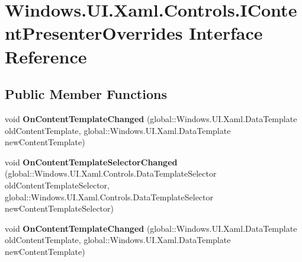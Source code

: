\hypertarget{interface_windows_1_1_u_i_1_1_xaml_1_1_controls_1_1_i_content_presenter_overrides}{}\section{Windows.\+U\+I.\+Xaml.\+Controls.\+I\+Content\+Presenter\+Overrides Interface Reference}
\label{interface_windows_1_1_u_i_1_1_xaml_1_1_controls_1_1_i_content_presenter_overrides}
\subsection*{Public Member Functions}
\begin{DoxyCompactItemize}
\item 
\mbox{\label{interface_windows_1_1_u_i_1_1_xaml_1_1_controls_1_1_i_content_presenter_overrides_ae8281d9b7f3dd003dfccb2720b1405d3}} 
void {\bfseries On\+Content\+Template\+Changed} (global\+::\+Windows.\+U\+I.\+Xaml.\+Data\+Template old\+Content\+Template, global\+::\+Windows.\+U\+I.\+Xaml.\+Data\+Template new\+Content\+Template)
\item 
\mbox{\label{interface_windows_1_1_u_i_1_1_xaml_1_1_controls_1_1_i_content_presenter_overrides_a87f3da45b7e3c94762174182d8c0e4bc}} 
void {\bfseries On\+Content\+Template\+Selector\+Changed} (global\+::\+Windows.\+U\+I.\+Xaml.\+Controls.\+Data\+Template\+Selector old\+Content\+Template\+Selector, global\+::\+Windows.\+U\+I.\+Xaml.\+Controls.\+Data\+Template\+Selector new\+Content\+Template\+Selector)
\item 
\mbox{\label{interface_windows_1_1_u_i_1_1_xaml_1_1_controls_1_1_i_content_presenter_overrides_ae8281d9b7f3dd003dfccb2720b1405d3}} 
void {\bfseries On\+Content\+Template\+Changed} (global\+::\+Windows.\+U\+I.\+Xaml.\+Data\+Template old\+Content\+Template, global\+::\+Windows.\+U\+I.\+Xaml.\+Data\+Template new\+Content\+Template)
\item 
\mbox{\label{interface_windows_1_1_u_i_1_1_xaml_1_1_controls_1_1_i_content_presenter_overrides_a87f3da45b7e3c94762174182d8c0e4bc}} 

\end{DoxyCompactItemize}
